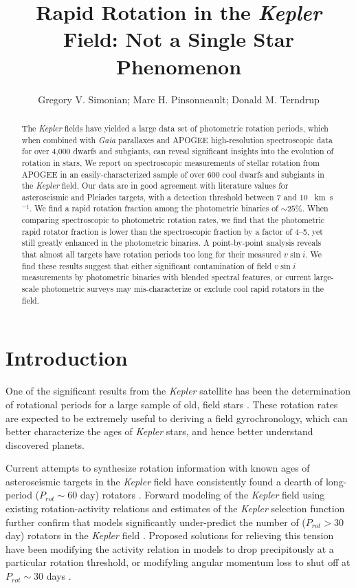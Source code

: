 \documentclass[manuscript]{aastex6}
\newcommand{\vsini}{\ensuremath{v \sin i}}
\newcommand{\Kepler}{\mbox{\textit{Kepler}}}
\newcommand{\Gaia}{\mbox{\textit{Gaia}}}
\newcommand{\kms}{\textrm{~km~s}\ensuremath{^{-1}}}
\begin{document}
\title{Rapid Rotation in the \Kepler{} Field: Not a Single Star
Phenomenon}
\author{Gregory V. Simonian; Marc H. Pinsonneault; Donald M. Terndrup}

\begin{abstract}
    The \Kepler{} fields have yielded a large data set of photometric rotation
    periods, which when combined with \Gaia{} parallaxes and APOGEE
    high-resolution spectroscopic data for over 4,000 dwarfs and subgiants, 
    can reveal significant insights into the evolution of rotation in stars, 
    We report on spectroscopic measurements of stellar rotation from APOGEE in an
    easily-characterized sample of over 600 cool dwarfs and subgiants in the
    \Kepler{} field. Our data are in good agreement with literature values for
    asteroseismic and Pleiades targets, with a detection threshold between 7 
    and 10 \kms. We find a rapid rotation fraction among the photometric
    binaries of \(\sim 25\%\). When comparing spectroscopic to photometric 
    rotation rates, we find that the photometric rapid rotator 
    fraction is lower than the spectroscopic fraction by a factor of 4--5, yet
    still greatly enhanced in the photometric binaries. A point-by-point 
    analysis reveals that almost all targets have rotation periods too long 
    for their measured \vsini{}. We find these results suggest that either 
    significant contamination of field \vsini{} measurements by photometric 
    binaries with blended spectral features, or current large-scale 
    photometric surveys may mis-characterize or exclude 
    cool rapid rotators in the field. 
\end{abstract}

\section{Introduction}

One of the significant results from the \Kepler{} satellite has been the
determination of rotational periods for a large sample of old, field stars
\citep{Basri11,Affer12,Nielsen13,Reinhold13,McQuillan14,Garcia14}.
These rotation rates are expected to be extremely useful to deriving a field
gyrochronology, which can better characterize the ages of
\Kepler{} stars, and hence better understand discovered planets.


Current attempts to synthesize rotation information with known ages of
asteroseismic targets in the \Kepler{} field have consistently found a dearth
of long-period (\(P_{rot} \sim 60\) day) rotators \citep{Angus15,vanSaders16}. 
Forward modeling of the \Kepler{} field using existing rotation-activity
relations and estimates of the \Kepler{} selection function further confirm 
that models significantly under-predict the number of (\(P_{rot} > 30\) day) 
rotators in the \Kepler{} field \citep{vanSaders18}. Proposed solutions for 
relieving this tension have been modifying the activity relation in models to 
drop precipitously at a particular rotation threshold, or modifyling angular 
momentum loss to shut off at \(P_{rot} \sim 30\) days \citep{vanSaders18}.
\end{document}
